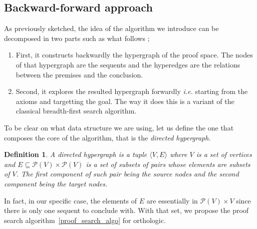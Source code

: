 \documentclass[a4paper, 11pt]{article}
\newtheorem{definition}[theorem]{Definition}
\newcommand{\ie}{ \textit{i.e.} }
\begin{document}
    \subsection{Backward-forward approach}
    As previously sketched, the idea of the algorithm we introduce can be decomposed in two parts such as
    what follows ;
    \begin{enumerate}
	\item
		First, it constructs backwardly the hypergraph of the proof space. The nodes of 
		    that hypergraph 
	are the sequents and the hyperedges are the relations between the premises and the conclusion. 
	\item
	Second, it explores the resulted hypergraph forwardly \ie starting from the axioms and targetting
	the goal. 
	The way it does this is a variant of the classical breadth-first search algorithm.
    \end{enumerate}
    To be clear on what data structure we are using, let us define the one that composes the core of the
    algorithm, that is the \textit{directed hypergraph}.
    \begin{definition}
	    A directed hypergraph is a tuple $\langle V,E\rangle$ where $V$ is a set of 
	    vertices and $E\subseteq\mathcal{P}(V)\times\mathcal{P}(V)$ is a set of 
	    subsets of pairs whose elements are subsets of $V$. The
	    first component of such pair being the source nodes and the second component being the
	    target nodes.
    \end{definition}
    In fact, in our specific case, the elements of $E$ are essentially in $\mathcal{P}(V)\times V$ since
    there is only one sequent to conclude with. With that set, we propose the proof search 
    algorithm~\ref{proof_search_algo} for orthologic.
\end{document}
